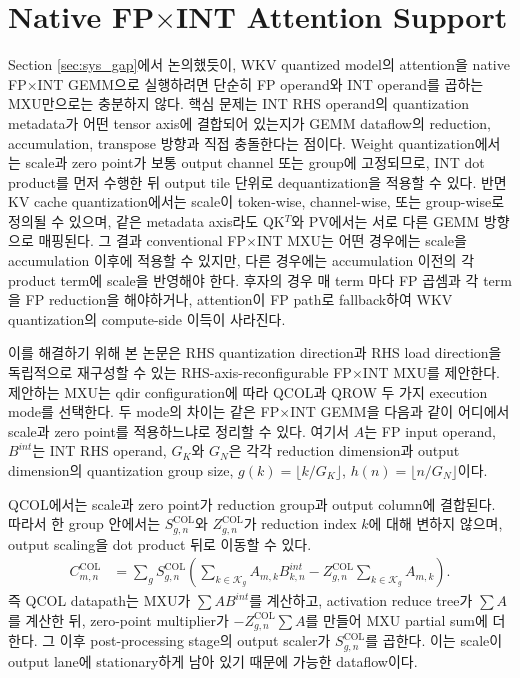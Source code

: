 \documentclass[11pt]{article}
\newcommand{\fpint}{FP$\times$INT}
\newcommand{\wkv}{WKV}
\begin{document}
\section{Native \fpint{} Attention Support}

Section \ref{sec:sys_gap}에서 논의했듯이, \wkv{} quantized model의 attention을 native \fpint{} GEMM으로 실행하려면 단순히 FP operand와 INT operand를 곱하는 MXU만으로는 충분하지 않다.
핵심 문제는 INT RHS operand의 quantization metadata가 어떤 tensor axis에 결합되어 있는지가 GEMM dataflow의 reduction, accumulation, transpose 방향과 직접 충돌한다는 점이다.
Weight quantization에서는 scale과 zero point가 보통 output channel 또는 group에 고정되므로, INT dot product를 먼저 수행한 뒤 output tile 단위로 dequantization을 적용할 수 있다.
반면 KV cache quantization에서는 scale이 token-wise, channel-wise, 또는 group-wise로 정의될 수 있으며, 같은 metadata axis라도 QK$^T$와 PV에서는 서로 다른 GEMM 방향으로 매핑된다.
그 결과 conventional \fpint{} MXU는 어떤 경우에는 scale을 accumulation 이후에 적용할 수 있지만, 다른 경우에는 accumulation 이전의 각 product term에 scale을 반영해야 한다.
후자의 경우 매 term 마다 FP 곱셈과 각 term을 FP reduction을 해야하거나, attention이 FP path로 fallback하여 \wkv{} quantization의 compute-side 이득이 사라진다.

이를 해결하기 위해 본 논문은 RHS quantization direction과 RHS load direction을 독립적으로 재구성할 수 있는 RHS-axis-reconfigurable \fpint{} MXU를 제안한다.
제안하는 MXU는 qdir configuration에 따라 QCOL과 QROW 두 가지 execution mode를 선택한다.
두 mode의 차이는 같은 \fpint{} GEMM을 다음과 같이 어디에서 scale과 zero point를 적용하느냐로 정리할 수 있다.
여기서 $A$는 FP input operand, $B^{int}$는 INT RHS operand, $G_K$와 $G_N$은 각각 reduction dimension과 output dimension의 quantization group size, $g(k)=\lfloor k/G_K \rfloor$, $h(n)=\lfloor n/G_N \rfloor$이다.

QCOL에서는 scale과 zero point가 reduction group과 output column에 결합된다.
따라서 한 group 안에서는 $S^{\mathrm{COL}}_{g,n}$와 $Z^{\mathrm{COL}}_{g,n}$가 reduction index $k$에 대해 변하지 않으며, output scaling을 dot product 뒤로 이동할 수 있다.
\begin{align}
    C^{\mathrm{COL}}_{m,n}
    &=
    \sum_g S^{\mathrm{COL}}_{g,n}
    \left(
        \sum_{k \in \mathcal{K}_g} A_{m,k} B^{int}_{k,n}
        -
        Z^{\mathrm{COL}}_{g,n} \sum_{k \in \mathcal{K}_g} A_{m,k}
    \right) .
    \label{eq:qcol-fpint}
\end{align}
즉 QCOL datapath는 MXU가 $\sum A B^{int}$를 계산하고, activation reduce tree가 $\sum A$를 계산한 뒤, zero-point multiplier가 $-Z^{\mathrm{COL}}_{g,n}\sum A$를 만들어 MXU partial sum에 더한다.
그 이후 post-processing stage의 output scaler가 $S^{\mathrm{COL}}_{g,n}$를 곱한다.
이는 scale이 output lane에 stationary하게 남아 있기 때문에 가능한 dataflow이다.
\end{document}
